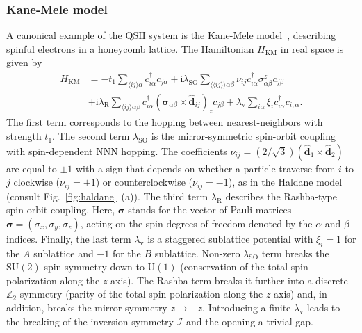 \subsubsection{Kane-Mele model}
A canonical example of the QSH system is the Kane-Mele model~\cite{KaneMeleGraphene}, describing spinful electrons in a honeycomb lattice. The Hamiltonian $H_{\mathrm{KM}}$ in real space is given by
\begin{equation}
\begin{aligned}
H_{\mathrm{KM}} &= -t_1 \sum_{\langle i  j \rangle \alpha}  c_{i\alpha}^{\dagger} c_{j \alpha}  + \mathrm{i} \lambda_{\mathrm{SO}} \sum_{\langle \langle i j \rangle \rangle \alpha \beta} \nu_{ij} c_{i \alpha} ^{\dagger} \sigma_{\alpha \beta}^z c_{j \beta} \\
&+ \mathrm{i} \lambda_{\mathrm{R}} \sum_{\langle i j \rangle \alpha \beta} c_{i \alpha}^{\dagger} \left( \boldsymbol{\sigma}_{\alpha \beta} \times \mathbf{\hat{d}}_{ij} \right)_z c_{j \beta} + \lambda_{\mathrm{v}} \sum_{i \alpha} \xi_i c_{i \alpha}^{\dagger} c_{i, \alpha}.
\label{eq:km}
\end{aligned}
\end{equation}
The first term corresponds to the hopping between nearest-neighbors with strength $t_1$. The second term $\lambda_{\mathrm{SO}}$ is the mirror-symmetric spin-orbit coupling with spin-dependent NNN hopping. The coefficients $\nu_{ij} = (2 / \sqrt{3}) ( \mathbf{\hat{d}}_1 \times \mathbf{\hat{d}}_2 )$ are equal to $\pm 1$ with a sign that depends on whether a particle traverse from $i$ to $j$ clockwise ($\nu_{ij} = +1$) or counterclockwise ($\nu_{ij} = -1$), as in the Haldane model (consult Fig.~\ref{fig:haldane}~(a)). The third term $\lambda_{\mathrm{R}}$ describes the Rashba-type spin-orbit coupling. Here, $\boldsymbol{\sigma}$ stands for the vector of Pauli matrices $\bm{\sigma} = (\sigma_x, \sigma_y, \sigma_z)$, acting on the spin degrees of freedom denoted by the $\alpha$ and $\beta$ indices. Finally, the last term $ \lambda_{\mathrm{v}}$ is a staggered sublattice potential with $ \xi_i= 1$ for the $A$ sublattice and $-1$ for the $B$ sublattice. Non-zero $\lambda_{\mathrm{SO}}$ term breaks the $\mathrm{SU} (2)$ spin symmetry down to $\mathrm{U}(1)$ (conservation of the total spin polarization along the $z$ axis). The Rashba term breaks it further into a discrete $\mathbb{Z}_2$ symmetry (parity of the total spin polarization along the $z$ axis) and, in addition, breaks the mirror symmetry $z \rightarrow -z$. Introducing a finite $ \lambda_{\mathrm{v}}$ leads to the breaking of the inversion symmetry $\mathcal{I}$ and the opening a trivial gap.

